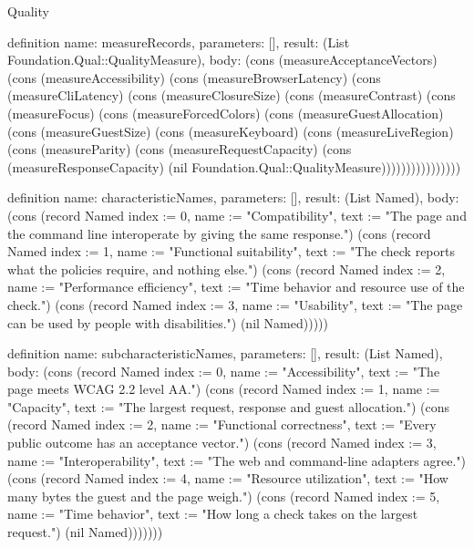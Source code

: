 \begin{lexlean}{Quality}
\begin{semanticmodule}
definition{
  name: measureRecords,
  parameters: [],
  result: (List Foundation.Qual::QualityMeasure),
  body: (cons (measureAcceptanceVectors) (cons (measureAccessibility) (cons (measureBrowserLatency) (cons (measureCliLatency) (cons (measureClosureSize) (cons (measureContrast) (cons (measureFocus) (cons (measureForcedColors) (cons (measureGuestAllocation) (cons (measureGuestSize) (cons (measureKeyboard) (cons (measureLiveRegion) (cons (measureParity) (cons (measureRequestCapacity) (cons (measureResponseCapacity) (nil Foundation.Qual::QualityMeasure))))))))))))))))
}

definition{
  name: characteristicNames,
  parameters: [],
  result: (List Named),
  body: (cons (record Named {index := 0, name := "Compatibility", text := "The page and the command line interoperate by giving the same response."}) (cons (record Named {index := 1, name := "Functional suitability", text := "The check reports what the policies require, and nothing else."}) (cons (record Named {index := 2, name := "Performance efficiency", text := "Time behavior and resource use of the check."}) (cons (record Named {index := 3, name := "Usability", text := "The page can be used by people with disabilities."}) (nil Named)))))
}

definition{
  name: subcharacteristicNames,
  parameters: [],
  result: (List Named),
  body: (cons (record Named {index := 0, name := "Accessibility", text := "The page meets WCAG 2.2 level AA."}) (cons (record Named {index := 1, name := "Capacity", text := "The largest request, response and guest allocation."}) (cons (record Named {index := 2, name := "Functional correctness", text := "Every public outcome has an acceptance vector."}) (cons (record Named {index := 3, name := "Interoperability", text := "The web and command-line adapters agree."}) (cons (record Named {index := 4, name := "Resource utilization", text := "How many bytes the guest and the page weigh."}) (cons (record Named {index := 5, name := "Time behavior", text := "How long a check takes on the largest request."}) (nil Named)))))))
}


\end{semanticmodule}
\end{lexlean}
